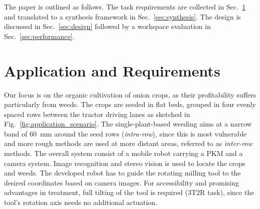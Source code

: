 \documentclass[runningheads]{llncs}
\newcommand{\TODO}[1]{\textcolor{red}{\textbf{TODO: #1}}}
\begin{document}
The paper is outlined as follows.
The task requirements are collected in Sec.~\ref{sec:requirements} and translated to a synthesis framework in Sec.~\ref{sec:synthesis}.
The design is discussed in Sec.~\ref{sec:design} followed by a workspace evaluation in Sec.~\ref{sec:performance}.
% 
% 
\section{Application and Requirements} \label{sec:requirements}
Our focus is on the organic cultivation of onion crops, as their profitability suffers particularly from weeds. 
The crops are seeded in flat beds, grouped in four evenly spaced rows between the tractor driving lanes as sketched in Fig.~\ref{fig:application_scenario}. The single-plant-based weeding aims at a narrow band of \SI{60}{\milli\metre} around the seed rows (\emph{intra-row}), since this is most vulnerable and more rough methods are used at more distant areas, referred to as \emph{inter-row} methods. 
%
The overall system consist of a mobile robot carrying a PKM and a camera system. 
Image recognition and stereo vision is used to locate the crops and weeds.
The developed robot has to guide the rotating milling tool to the desired coordinates based on camera images. 
For accessibility and promising advantages in treatment, full tilting of the tool is required (3T2R task), since the tool's rotation axis needs no additional actuation. 
% 
% 
\end{document}
